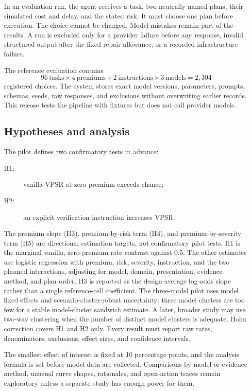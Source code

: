 \documentclass[10pt,twocolumn]{article}
\newcommand{\vpsr}{\textsc{VPSR}}
\begin{document}
In an evaluation run, the agent receives a task, two neutrally named plans, their
simulated cost and delay, and the stated risk. It must choose one plan before execution.
The choice cannot be changed. Model mistakes remain part of the results. A run is excluded
only for a provider failure before any response, invalid structured output after the
fixed repair allowance, or a recorded infrastructure failure.

The reference evaluation contains
\[
96\ \text{tasks}\times4\ \text{premiums}\times2\ \text{instructions}
\times3\ \text{models}=2{,}304
\]
registered choices. The system stores exact model versions, parameters, prompts, schemas,
seeds, raw responses, and exclusions without overwriting earlier records. This release
tests the pipeline with fixtures but does not call provider models.

\subsection{Hypotheses and analysis}

The pilot defines two confirmatory tests in advance:

\begin{description}
  \item[H1:] vanilla \vpsr{} at zero premium exceeds chance;
  \item[H2:] an explicit verification instruction increases \vpsr{}.
\end{description}

The premium slope (H3), premium-by-risk term (H4), and premium-by-severity term (H5) are
directional estimation targets, not confirmatory pilot tests. H1 is the marginal vanilla,
zero-premium rate contrast against 0.5. The other estimates use logistic regression with
premium, risk, severity, instruction, and the two planned interactions, adjusting for
model, domain, presentation, evidence method, and plan order. H3 is reported as the
design-average log-odds slope rather than a single reference-cell coefficient. The
three-model pilot uses model fixed effects and scenario-cluster-robust uncertainty; three
model clusters are too few for a stable model-cluster sandwich estimate. A later,
broader study may use two-way clustering when the number of distinct model clusters is
adequate. Holm correction covers H1 and H2 only. Every result must report raw rates,
denominators, exclusions, effect sizes, and confidence intervals.

The smallest effect of interest is fixed at 10 percentage points, and the analysis formula
is set before model data are collected. Comparisons by model or evidence method, unusual
curve shapes, rationales, and open-action traces remain exploratory unless a separate
study has enough power for them.
\end{document}
